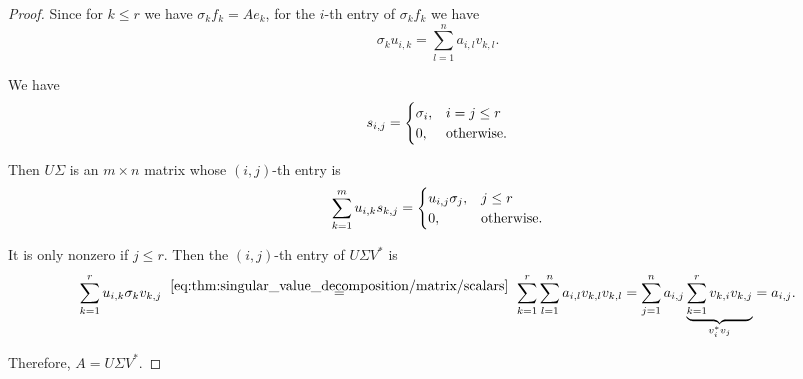 \begin{proof}
  Since for \( k \leq r \) we have \( \sigma_k f_k = A e_k \), for the \( i \)-th entry of \( \sigma_k f_k \) we have
  \begin{equation}\label{eq:thm:singular_value_decomposition/matrix/scalars}
    \sigma_k u_{i,k} = \sum_{l=1}^n a_{i,l} v_{k,l}.
  \end{equation}

  We have
  \begin{equation*}
    s_{i,j} = \begin{cases}
      \sigma_i, &i = j \leq r \\
      0,        &\T{otherwise.}
    \end{cases}
  \end{equation*}

  Then \( U \Sigma \) is an \( m \times n \) matrix whose \( (i, j) \)-th entry is
  \begin{equation*}
    \sum_{k=1}^m u_{i,k} s_{k,j}
    =
    \begin{cases}
      u_{i,j} \sigma_j, &j \leq r \\
      0,                &\T{otherwise.}
    \end{cases}
  \end{equation*}

  It is only nonzero if \( j \leq r \). Then the \( (i, j) \)-th entry of \( U \Sigma V^* \) is
  \begin{equation*}
    \sum_{k=1}^r u_{i,k} \sigma_k v_{k,j}
    \reloset {\eqref{eq:thm:singular_value_decomposition/matrix/scalars}} =
    \sum_{k=1}^r \sum_{l=1}^n a_{i,l} v_{k,l} v_{k,l}
    =
    \sum_{j=1}^n a_{i,j} \underbrace{ \sum_{k=1}^r v_{k,i} v_{k,j} }_{ v_i^* v_j }
    =
    a_{i,j}.
  \end{equation*}

  Therefore, \( A = U \Sigma V^* \).
\end{proof}

